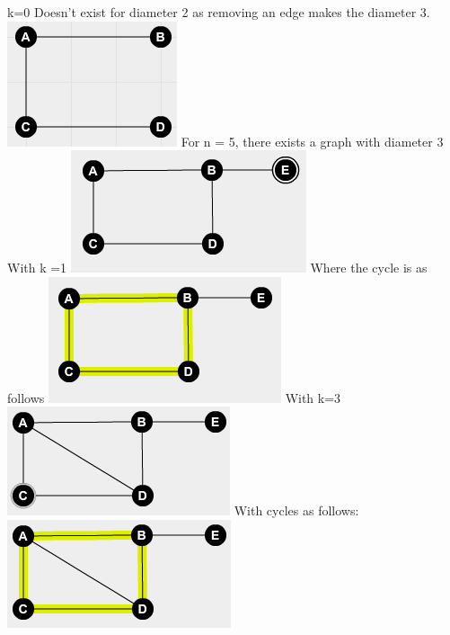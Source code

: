 \documentclass{article}
\begin{document}
	\newline
	k=0 Doesn't exist for diameter 2 as removing an edge makes the diameter 3.
	\newline
	\includegraphics{40None}
	\newline
	For n = 5, there exists a graph with diameter 3
	\newline
	With k =1
	\newline
	\includegraphics{5None1}
	\newline
	Where the cycle is as follows
	\newline
	\includegraphics{51Cycle1}
	\newline
	With k=3
	\newline
	\includegraphics{5None2}
	\newline
	With cycles as follows:
	\newline
	\includegraphics{53Cycle1}
\end{document}
